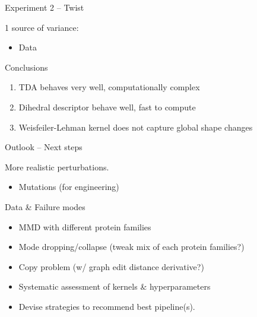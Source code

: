 \documentclass[aspectratio=169, 10pt, dvipsnames]{beamer}
\begin{document}
{\begin{frame}[fragile]{Experiment 2 -- Twist}
\begin{minipage}{0.38\textwidth}
      \pause\small 1 source of variance:
      \begin{itemize}
        \pause\small\item Data
      \end{itemize}

      \begin{alert}{Conclusions}
        \begin{enumerate}
          \pause\item TDA behaves very well, computationally complex
          \pause\item Dihedral descriptor behave well, fast to compute
          \pause\item Weisfeiler-Lehman kernel does not capture global shape changes
        \end{enumerate}
      \end{alert}
    \end{minipage}
  \end{frame}
}

\begin{frame}[fragile]{Outlook -- Next steps}
  \begin{minipage}{0.48\textwidth}
    More realistic perturbations.
    \begin{itemize}
      \pause \item Mutations (for engineering)
    \end{itemize}
    Data \& Failure modes
    \begin{itemize}
      \pause \item MMD with different protein families
      \pause \item Mode dropping/collapse (tweak mix of each protein families?)
      \pause \item Copy problem (w/ graph edit distance derivative?)
    \end{itemize}

  \end{minipage}
  \hfill
  \begin{minipage}{0.48\textwidth}
    \begin{itemize}
      \pause\item Systematic assessment of kernels \& hyperparameters
      \pause\item Devise strategies to recommend best pipeline(s).
     \end{itemize}
  \end{minipage}
\end{frame}
\end{document}
